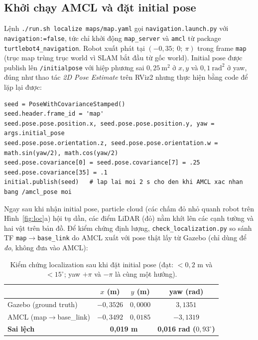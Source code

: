 \documentclass[a4paper,12pt]{article}
\newcommand{\rospkg}[1]{\texttt{#1}}
\begin{document}
\subsection{Khởi chạy AMCL và đặt initial pose}
Lệnh \texttt{./run.sh localize maps/map.yaml} gọi \texttt{navigation.launch.py} với \texttt{navigation:=false}, tức chỉ khởi động \texttt{map\_server} và \texttt{amcl} từ package \rospkg{turtlebot4\_navigation}. Robot xuất phát tại $(-0{,}35;\ 0;\ \pi)$ trong frame \texttt{map} (trục map trùng trục world vì SLAM bắt đầu từ gốc world). Initial pose được publish lên \texttt{/initialpose} với hiệp phương sai $0{,}25\ \text{m}^2$ ở $x,y$ và $0{,}1\ \text{rad}^2$ ở yaw, đúng như thao tác \emph{2D Pose Estimate} trên RViz2 nhưng thực hiện bằng code để lặp lại được:
\begin{lstlisting}
seed = PoseWithCovarianceStamped()
seed.header.frame_id = 'map'
seed.pose.pose.position.x, seed.pose.pose.position.y, yaw = args.initial_pose
seed.pose.pose.orientation.z, seed.pose.pose.orientation.w = math.sin(yaw/2), math.cos(yaw/2)
seed.pose.covariance[0] = seed.pose.covariance[7] = .25
seed.pose.covariance[35] = .1
initial.publish(seed)   # lap lai moi 2 s cho den khi AMCL xac nhan bang /amcl_pose moi
\end{lstlisting}

Ngay sau khi nhận initial pose, particle cloud (các chấm đỏ nhỏ quanh robot trên Hình~\ref{fig:loc}a) hội tụ dần, các điểm LiDAR (đỏ) nằm khít lên các cạnh tường và hai vật trên bản đồ. Để kiểm chứng định lượng, \texttt{check\_localization.py} so sánh TF \texttt{map}$\to$\texttt{base\_link} do AMCL xuất với pose thật lấy từ Gazebo (chỉ dùng để \emph{đo}, không đưa vào AMCL):

\begin{table}[htbp]
\centering\small
\begin{tabular}{lccc}
\toprule
 & $x$ (m) & $y$ (m) & yaw (rad) \\\midrule
Gazebo (ground truth) & $-0{,}3526$ & $0{,}0000$ & $3{,}1351$ \\
AMCL (map$\to$base\_link) & $-0{,}3492$ & $0{,}0185$ & $-3{,}1319$ \\
\textbf{Sai lệch} & \multicolumn{2}{c}{\textbf{0,019 m}} & \textbf{0,016 rad ($0{,}93^\circ$)} \\\bottomrule
\end{tabular}
\caption{Kiểm chứng localization sau khi đặt initial pose (đạt: $<0{,}2$ m và $<15^\circ$; yaw $+\pi$ và $-\pi$ là cùng một hướng).}
\end{table}
\end{document}
